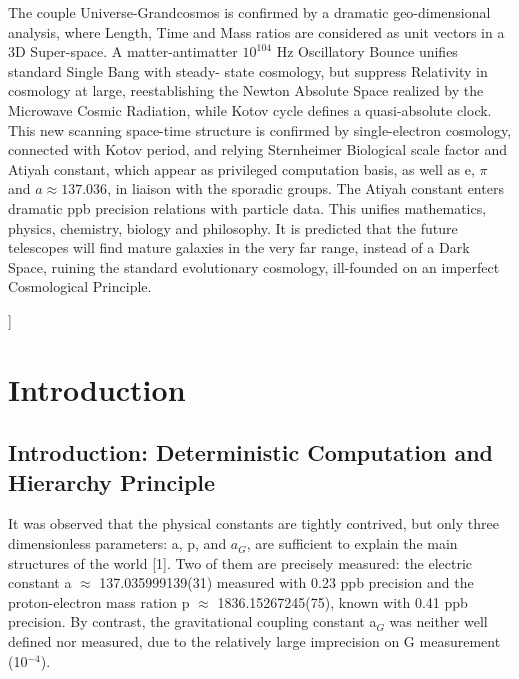 \documentclass[twoside,draft]{article}
\begin{document}
\begin{center}
{{The couple Universe-Grandcosmos is confirmed by a dramatic geo-dimensional analysis,
where Length, Time and Mass ratios are considered as unit vectors in a 3D Super-space. A
matter-antimatter $10^{104}$ Hz Oscillatory Bounce unifies standard Single Bang with steady-
state cosmology, but suppress Relativity in cosmology at large, reestablishing the Newton
Absolute Space realized by the Microwave Cosmic Radiation, while Kotov cycle defines a
quasi-absolute clock. This new scanning space-time structure is confirmed by single-electron
cosmology, connected with Kotov period, and relying Sternheimer Biological scale factor and
Atiyah constant, which appear as privileged computation basis, as well as e, $\pi$ and $a \approx 137.036$,
in liaison with the sporadic groups. The Atiyah constant enters dramatic ppb precision
relations with particle data. This unifies mathematics, physics, chemistry, biology and
philosophy. It is predicted that the future telescopes will find mature galaxies in the very far range,
instead of a Dark Space, ruining the standard evolutionary cosmology, ill-founded on an imperfect
Cosmological Principle.

}}\smallskip
\end{center}]{%


\setcounter{section}{0}
\setcounter{equation}{0}
\setcounter{figure}{0}
\setcounter{table}{0}
\setcounter{page}{1}



\section{Introduction}
\subsection{Introduction: Deterministic Computation and Hierarchy Principle}
It was observed that the physical constants are tightly contrived, but only three dimensionless parameters: a, p, and $a_{G}$, are sufficient to explain the main structures of the world [1]. Two of them are precisely measured: the electric constant a $\approx$ 137.035999139(31) measured with 0.23 ppb precision and the proton-electron mass ration p $\approx$ 1836.15267245(75), known with 0.41 ppb precision. By contrast, the gravitational coupling constant a$_G\!$ was neither well defined nor measured, due to the relatively large imprecision on G measurement (10$^{-4}\!$).

}
\end{document}
